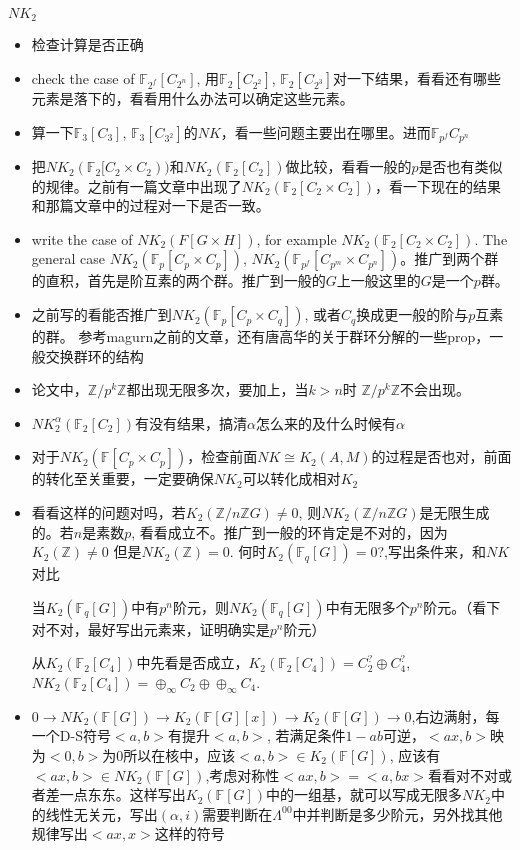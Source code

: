 $NK_2$
\begin{itemize}
	\item 检查计算是否正确
	\item check the case of $\mathbb{F}_{2^f}[C_{2^n}]$, 用$\mathbb{F}_{2}[C_{2^2}]$, $\mathbb{F}_{2}[C_{2^3}]$对一下结果，看看还有哪些元素是落下的，看看用什么办法可以确定这些元素。
	\item 算一下$\mathbb{F}_{3}[C_{3}]$, $\mathbb{F}_{3}[C_{3^2}]$的$NK$，看一些问题主要出在哪里。进而$\mathbb{F}_{p^f} C_{p^n}$
	\item 把$NK_2(\mathbb{F}_2[C_2\times C_2))$和$NK_2(\mathbb{F}_2[C_2])$做比较，看看一般的$p$是否也有类似的规律。之前有一篇文章中出现了$NK_2(\mathbb{F}_2[C_2\times C_2])$，看一下现在的结果和那篇文章中的过程对一下是否一致。
	\item write the case of $NK_2(F[G\times H])$, for example $NK_2(\mathbb{F}_2[C_2\times C_2])$.  The general case $NK_2(\mathbb{F}_p[C_p\times C_p])$, $NK_2(\mathbb{F}_{p^f}[C_{p^m}\times C_{p^n}])$。推广到两个群的直积，首先是阶互素的两个群。推广到一般的$G$上一般这里的$G$是一个$p$群。
	\item 之前写的看能否推广到$NK_2(\mathbb{F}_p[C_p\times C_q])$, 或者$C_q$换成更一般的阶与$p$互素的群。 参考magurn之前的文章，还有唐高华的关于群环分解的一些prop，一般交换群环的结构
	\item 论文中，$\mathbb{Z}/p^k\mathbb{Z}$都出现无限多次，要加上，当$k>n$时 $\mathbb{Z}/p^k\mathbb{Z}$不会出现。
	\item $NK_2^\alpha(\mathbb{F}_2[C_2])$有没有结果，搞清$\alpha$怎么来的及什么时候有$\alpha$
	\item 对于$NK_2(\mathbb{F}[C_p\times C_p])$，检查前面$NK\cong K_2(A,M)$的过程是否也对，前面的转化至关重要，一定要确保$NK_2$可以转化成相对$K_2$
	\item 看看这样的问题对吗，若$K_2(\mathbb{Z}/n\mathbb{Z} G)\neq 0$, 则$NK_2(\mathbb{Z}/n\mathbb{Z} G)$是无限生成的。若$n$是素数$p$, 看看成立不。推广到一般的环肯定是不对的，因为$K_2(\mathbb{Z})\neq 0$ 但是$NK_2(\mathbb{Z})=0$. 何时$K_2(\mathbb{F}_q[G])=0$?,写出条件来，和$NK$对比
	\begin{prop}
		当$K_2(\mathbb{F}_q[G])$中有$p^n$阶元，则$NK_2(\mathbb{F}_q[G])$中有无限多个$p^n$阶元。（看下对不对，最好写出元素来，证明确实是$p^n$阶元）
	\end{prop}
	从$K_2(\mathbb{F}_2[C_4])$中先看是否成立，$K_2(\mathbb{F}_2[C_4])=C_2^? \oplus C_4^?$, $NK_2(\mathbb{F}_2[C_4])=\oplus_{\infty} C_2 \oplus \oplus_{\infty} C_4$.
	\item $0\longrightarrow NK_2(\mathbb{F}[G])\longrightarrow K_2(\mathbb{F}[G][x])\longrightarrow K_2(\mathbb{F}[G])\longrightarrow 0$,右边满射，每一个D-S符号$<a,b>$有提升$<a,b>$, 若满足条件$1-ab$可逆，$<ax,b>$映为$<0,b>$为$0$所以在核中，应该$<a,b>\in K_2(\mathbb{F}[G])$, 应该有$<ax,b>\in NK_2(\mathbb{F}[G])$,考虑对称性$<ax,b>=<a,bx>$看看对不对或者差一点东东。这样写出$K_2(\mathbb{F}[G])$中的一组基，就可以写成无限多$NK_2$中的线性无关元，写出$(\alpha,i)$需要判断在$\Lambda^{00}$中并判断是多少阶元，另外找其他规律写出$<ax,x>$这样的符号

\end{itemize}
